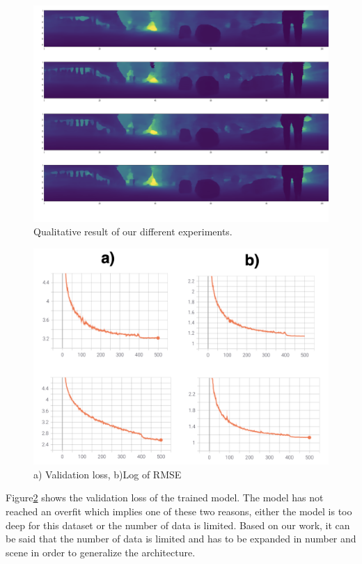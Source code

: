 \documentclass[english, LaM, oneside]{sapthesis}%
\begin{document}
\begin{figure}[h!] %
    \centering
    \includegraphics[width=\linewidth]{Images/ress.png}
    \caption{Qualitative result of our different experiments.}
    \label{fig:l}
\end{figure}

\begin{figure}[h!] %
    \centering
    \includegraphics[width=\linewidth]{Images/g_1.png}
    \caption{a) Validation loss, b)Log of RMSE}
    \label{fig:loss}
\end{figure}


Figure\ref{fig:loss} shows the validation loss of the trained model. The model has not reached an overfit which implies one of these two reasons, either the model is too deep for this dataset or the number of data is limited. Based on our work, it can be said that the number of data is limited and has to be expanded in number and scene in order to generalize the architecture. 
\end{document}
